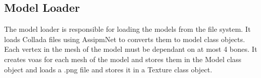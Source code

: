 \subsection{Model Loader}

The model loader is responsible for loading the models from the file system.
It loads Collada files using AssipmNet to converts them to model class objects.
Each vertex in the mesh of the model must be dependant on at most 4 bones.
It creates voas for each mesh of the model and stores them in the Model class object and loads a .png file and stores it in a Texture class object.
